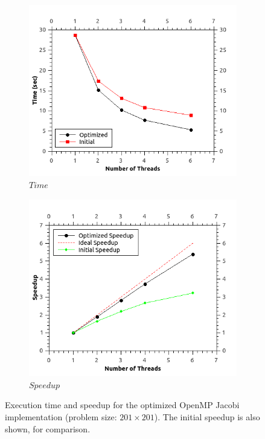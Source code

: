 \documentclass[11pt]{report}
\begin{document}
\begin{figure}[th!]
\centering
\begin{subfigure}{0.45\textwidth}
  \centering
  \includegraphics[width=1.0\linewidth]{images/jacobi_time_201_opt}
  \caption{$Time$}
\end{subfigure}
\begin{subfigure}{0.45\textwidth}
  \centering
  \includegraphics[width=1.0\linewidth]{images/jacobi_speedup_201_opt}
  \caption{$Speedup$}
\end{subfigure}
\caption{Execution time and speedup for the optimized OpenMP Jacobi implementation (problem size: $201 \times 201$). The initial speedup is also shown, for comparison. }
\label{fig:example5.4}
\end{figure}
\end{document}
